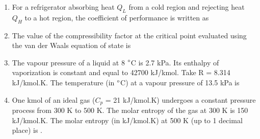 \documentclass[a4paper,10pt]{article}
\begin{document}
\begin{enumerate}
    \item For a refrigerator absorbing heat $Q_L$ from a cold region and rejecting heat $Q_H$ to a hot region, the coefficient of performance is written as
    \hfill{}
    \begin{enumerate}[label=\Alph*)]
    \end{enumerate}

    \item The value of the compressibility factor at the critical point evaluated using the van der Waals equation of state is
    \hfill{}
    \begin{enumerate}[label=\Alph*)]
    \end{enumerate}

    \item The vapour pressure of a liquid at 8 $\degree$C is 2.7 kPa. Its enthalpy of vaporization is constant and equal to 42700 kJ/kmol. Take R = 8.314 kJ/kmol.K. The temperature (in $\degree$C) at a vapour pressure of 13.5 kPa is
    \hfill{}
    \begin{enumerate}[label=\Alph*)]
    \end{enumerate}

    \item One kmol of an ideal gas ($C_p$ = 21 kJ/kmol.K) undergoes a constant pressure process from 300 K to 500 K. The molar entropy of the gas at 300 K is 150 kJ/kmol.K. The molar entropy (in kJ/kmol.K) at 500 K (up to 1 decimal place) is \underline{\hspace{2cm}}.
    \hfill{}


\end{enumerate}
\end{document}
